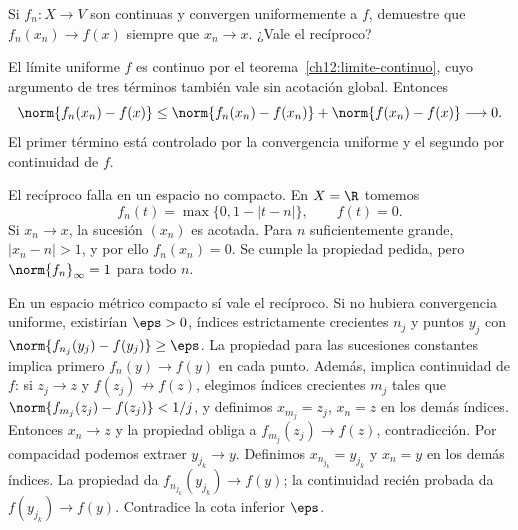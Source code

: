 \begin{ejercicio}\label{ej:lectura-26-6}
Si $f_n:X\to V$ son continuas y convergen uniformemente a $f$, demuestre que $f_n(x_n)\to f(x)$ siempre que $x_n\to x$. ¿Vale el recíproco?
\end{ejercicio}
\begin{solucion}
El límite uniforme $f$ es continuo por el teorema~\ref{ch12:limite-continuo}, cuyo argumento de tres términos también vale sin acotación global. Entonces
\[
 \norm{f_n(x_n)-f(x)}
 \le\norm{f_n(x_n)-f(x_n)}+\norm{f(x_n)-f(x)}\longrightarrow0.
\]
El primer término está controlado por la convergencia uniforme y el segundo por continuidad de $f$.

El recíproco falla en un espacio no compacto. En $X=\R$ tomemos
\[
 f_n(t)=\max\{0,1-|t-n|\},\qquad f(t)=0.
\]
Si $x_n\to x$, la sucesión $(x_n)$ es acotada. Para $n$ suficientemente grande, $|x_n-n|>1$, y por ello $f_n(x_n)=0$. Se cumple la propiedad pedida, pero $\norm{f_n}_\infty=1$ para todo $n$.

En un espacio métrico compacto sí vale el recíproco. Si no hubiera convergencia uniforme, existirían $\eps>0$, índices estrictamente crecientes $n_j$ y puntos $y_j$ con $\norm{f_{n_j}(y_j)-f(y_j)}\ge\eps$. La propiedad para las sucesiones constantes implica primero $f_n(y)\to f(y)$ en cada punto. Además, implica continuidad de $f$: si $z_j\to z$ y $f(z_j)\not\to f(z)$, elegimos índices crecientes $m_j$ tales que $\norm{f_{m_j}(z_j)-f(z_j)}<1/j$, y definimos $x_{m_j}=z_j$, $x_n=z$ en los demás índices. Entonces $x_n\to z$ y la propiedad obliga a $f_{m_j}(z_j)\to f(z)$, contradicción. Por compacidad podemos extraer $y_{j_k}\to y$. Definimos $x_{n_{j_k}}=y_{j_k}$ y $x_n=y$ en los demás índices. La propiedad da $f_{n_{j_k}}(y_{j_k})\to f(y)$; la continuidad recién probada da $f(y_{j_k})\to f(y)$. Contradice la cota inferior $\eps$.
\end{solucion}

